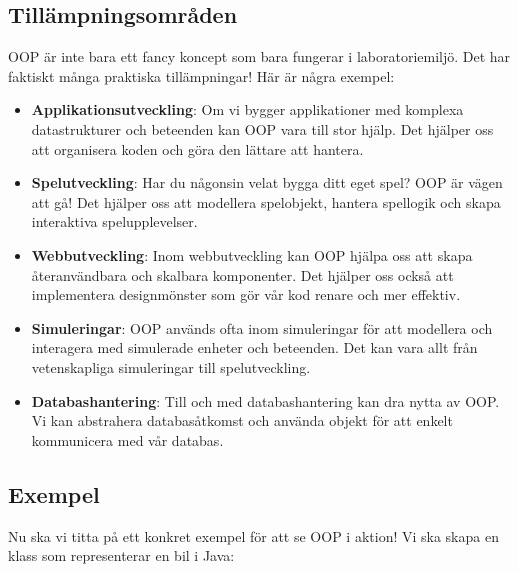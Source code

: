 \hypertarget{tilluxe4mpningsomruxe5den}{%
\subsection{Tillämpningsområden}\label{tilluxe4mpningsomruxe5den}}

OOP är inte bara ett fancy koncept som bara fungerar i laboratoriemiljö.
Det har faktiskt många praktiska tillämpningar! Här är några exempel:

\begin{itemize}
\tightlist
\item
  \textbf{Applikationsutveckling}: Om vi bygger applikationer med
  komplexa datastrukturer och beteenden kan OOP vara till stor hjälp.
  Det hjälper oss att organisera koden och göra den lättare att hantera.
\item
  \textbf{Spelutveckling}: Har du någonsin velat bygga ditt eget spel?
  OOP är vägen att gå! Det hjälper oss att modellera spelobjekt, hantera
  spellogik och skapa interaktiva spelupplevelser.
\item
  \textbf{Webbutveckling}: Inom webbutveckling kan OOP hjälpa oss att
  skapa återanvändbara och skalbara komponenter. Det hjälper oss också
  att implementera designmönster som gör vår kod renare och mer
  effektiv.
\item
  \textbf{Simuleringar}: OOP används ofta inom simuleringar för att
  modellera och interagera med simulerade enheter och beteenden. Det kan
  vara allt från vetenskapliga simuleringar till spelutveckling.
\item
  \textbf{Databashantering}: Till och med databashantering kan dra nytta
  av OOP. Vi kan abstrahera databasåtkomst och använda objekt för att
  enkelt kommunicera med vår databas.
\end{itemize}

\hypertarget{exempel}{%
\subsection{Exempel}\label{exempel}}

Nu ska vi titta på ett konkret exempel för att se OOP i aktion! Vi ska
skapa en klass som representerar en bil i Java:

